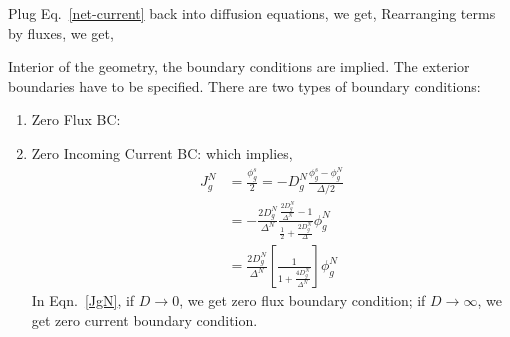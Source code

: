 \documentclass{school-22.211-notes}
\begin{document}
Plug Eq.~\ref{net-current} back into diffusion equations, we get, 
Rearranging terms by fluxes, we get, 


Interior of the geometry, the boundary conditions are implied. The exterior boundaries have to be specified. There are two types of boundary conditions:
\begin{enumerate}
\item Zero Flux BC: 
\item Zero Incoming Current BC:
which implies,
\begin{align}
  J_g^N &= \frac{\phi_g^s}{2} = -D_g^N \frac{\phi_g^s - \phi_g^N}{\Delta/2} \\
  &= - \frac{2 D_g^N}{\Delta^N} \frac{\frac{2D_g^N}{\Delta^N} - 1}{\frac{1}{2} + \frac{2D_g^N}{\Delta}} \phi_g^N \\
  &= \boxed{ \frac{2D_g^N}{\Delta^N} \left[ \frac{1}{1 + \frac{4 D_g^N}{\Delta^N}} \right] \phi_g^N } \label{JgN}
\end{align}
In Eqn.~\ref{JgN}, if $D \to 0$, we get zero flux boundary condition; if $D \to \infty$, we get zero current boundary condition. 
\end{enumerate}
\end{document}
